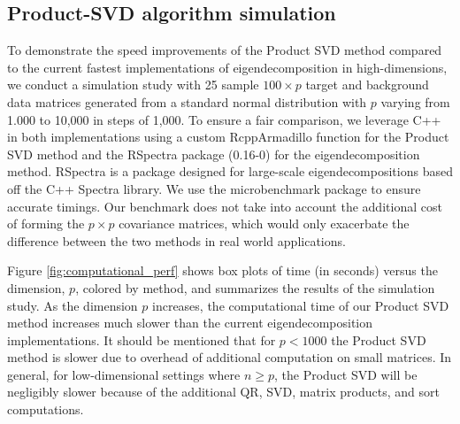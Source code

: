 \documentclass[10pt]{article}
\begin{document}



\subsection{\label{sec:product-svd} Product-SVD algorithm simulation}
To demonstrate the speed improvements of the Product SVD method compared to the current fastest implementations of eigendecomposition in high-dimensions, we conduct a simulation study with 25 sample $100 \times p$ target and background data matrices generated from a standard normal distribution with $p$ varying from 1.000 to 10,000 in steps of 1,000. To ensure a fair comparison, we leverage C++ in both implementations using a custom RcppArmadillo \cite{rcpparmadillo} function for the Product SVD method and the RSpectra package (0.16-0) \cite{Rspectra} for the eigendecomposition method. RSpectra is a package designed for large-scale eigendecompositions based off the C++ Spectra library. We use the microbenchmark package \cite{microbenchmark} to ensure accurate timings. Our benchmark does not take into account the additional cost of forming the $p\times p$ covariance matrices, which would only exacerbate the difference between the two methods in real world applications.

Figure \ref{fig:computational_perf} shows box plots of time (in seconds) versus the dimension, $p$, colored by method, and summarizes the results of the simulation study. As the dimension $p$ increases, the computational time of our Product SVD method increases much slower than the current eigendecomposition implementations. It should be mentioned that for $p < 1000$ the Product SVD method is slower due to overhead of additional computation on small matrices. In general, for low-dimensional settings where $n \geq p$, the Product SVD will be negligibly slower because of the additional QR, SVD, matrix products, and sort computations. 
\end{document}
